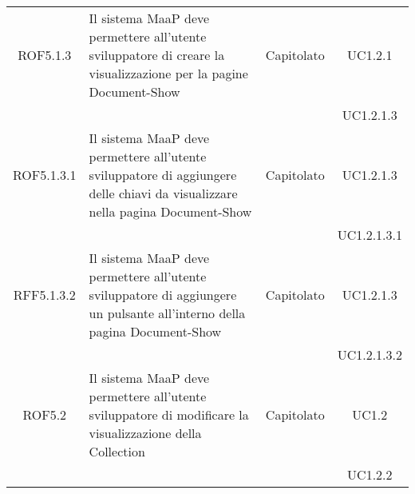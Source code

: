 \begin{longtable}{|c|p{6cm}|c|c|}
\midrule
ROF5.1.3
& Il sistema MaaP deve permettere all'utente sviluppatore di creare la visualizzazione per la pagine Document-Show
& Capitolato
& UC1.2.1\\
& & & UC1.2.1.3
\\
\midrule
ROF5.1.3.1
& Il sistema MaaP deve permettere all'utente sviluppatore di aggiungere delle chiavi da visualizzare nella pagina Document-Show
& Capitolato
& UC1.2.1.3\\
& & & UC1.2.1.3.1
\\
\midrule
RFF5.1.3.2
& Il sistema MaaP deve permettere all'utente sviluppatore di aggiungere un pulsante all'interno della  pagina Document-Show
& Capitolato
& UC1.2.1.3\\
& & & UC1.2.1.3.2
\\
\midrule
ROF5.2
& Il sistema MaaP deve permettere all'utente sviluppatore di modificare la visualizzazione della Collection
& Capitolato
& UC1.2\\
& & & UC1.2.2
\\



\end{longtable}

